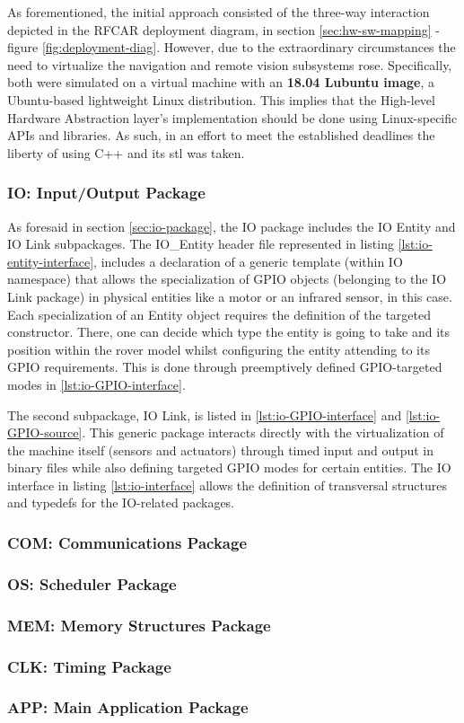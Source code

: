 As forementioned, the initial approach consisted of the three-way interaction depicted in the RFCAR deployment diagram, in section \ref{sec:hw-sw-mapping} - figure \ref{fig:deployment-diag}. However, due to the extraordinary circumstances the need to virtualize the navigation and remote vision subsystems rose. Specifically, both were simulated on a virtual machine with an \textbf{18.04 Lubuntu image}, a Ubuntu-based lightweight Linux distribution. This implies that the High-level Hardware Abstraction layer's implementation should be done using Linux-specific APIs and libraries. As such, in an effort to meet the established deadlines the liberty of using C++ and its \gls{stl} was taken. 
%
\subsubsection{IO: Input/Output Package}
As foresaid in section \ref{sec:io-package}, the IO package includes the IO Entity and IO Link subpackages. The IO\_Entity header file represented in listing \ref{lst:io-entity-interface}, includes a declaration of a generic template (within IO namespace) that allows the specialization of GPIO objects (belonging to the IO Link package) in physical entities like a motor or an infrared sensor, in this case. Each specialization of an Entity object requires the definition of the targeted constructor. There, one can decide which type the entity is going to take and its position within the rover model whilst configuring the entity attending to its GPIO requirements. This is done through preemptively defined GPIO-targeted modes in \ref{lst:io-GPIO-interface}.\par
%
The second subpackage, IO Link, is listed in \ref{lst:io-GPIO-interface} and \ref{lst:io-GPIO-source}. This generic package interacts directly with the virtualization of the machine itself (sensors and actuators) through timed input and output in binary files while also defining targeted GPIO modes for certain entities. The IO interface in listing \ref{lst:io-interface} allows the definition of transversal structures and typedefs for the IO-related packages.
%

%
%
\subsubsection{COM: Communications Package}
%
\subsubsection{OS: Scheduler Package}
%
\subsubsection{MEM: Memory Structures Package}
%
\subsubsection{CLK: Timing Package}
%

%
\subsubsection{APP: Main Application Package}
%